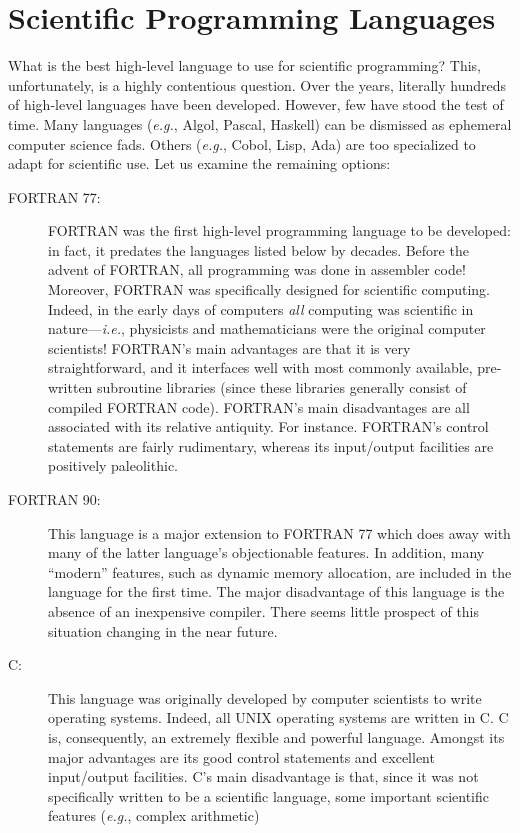 \section{Scientific Programming Languages}
What is the best high-level  language to use for scientific
programming? This, unfortunately, is a highly
contentious question. Over the years, literally hundreds of high-level languages
have been developed. However, few have stood the test of time. Many languages
({\em e.g.}, Algol, Pascal, Haskell) can be dismissed as ephemeral computer
science fads. Others  ({\em e.g.}, Cobol, Lisp, Ada) are too specialized
to adapt for scientific use.
Let us examine the remaining options:
\begin{description}
\item [{\sc FORTRAN 77}:] FORTRAN was the first high-level programming language to be developed: in fact,
it predates the languages listed below by decades. Before the advent of FORTRAN, all programming
was done in assembler code!
Moreover, FORTRAN was specifically designed for scientific computing. Indeed, in the early
days of computers {\em all}\/ computing was scientific in nature---{\em i.e.}, 
physicists and mathematicians were the
original computer scientists!
FORTRAN's main advantages are that it is very straightforward, and it interfaces well with
most commonly available, pre-written subroutine libraries (since these libraries 
generally consist of compiled FORTRAN code). FORTRAN's main disadvantages are all
associated with  its relative antiquity. For instance. FORTRAN's control
statements are fairly rudimentary, whereas its input/output facilities are positively paleolithic. 
\item [{\sc FORTRAN 90}:] This language is a major extension to FORTRAN 77 which does away with many of
the latter language's objectionable features. In addition, many ``modern'' features,
such as dynamic memory allocation, are included in the language for the first time. The major
disadvantage of this language is the absence of an inexpensive compiler.
There seems little prospect of this situation changing in the near future.
\item [{\sc C}:] This language was originally developed by computer scientists to write operating systems.
Indeed, all UNIX operating systems are written in C.
 C is,
consequently, an extremely flexible and powerful language. Amongst its major 
advantages are its good control statements and 
excellent input/output
facilities. C's main disadvantage is that, since it was not specifically written to be a
scientific language, some important scientific features ({\em e.g.}, complex arithmetic)

\end{description}
